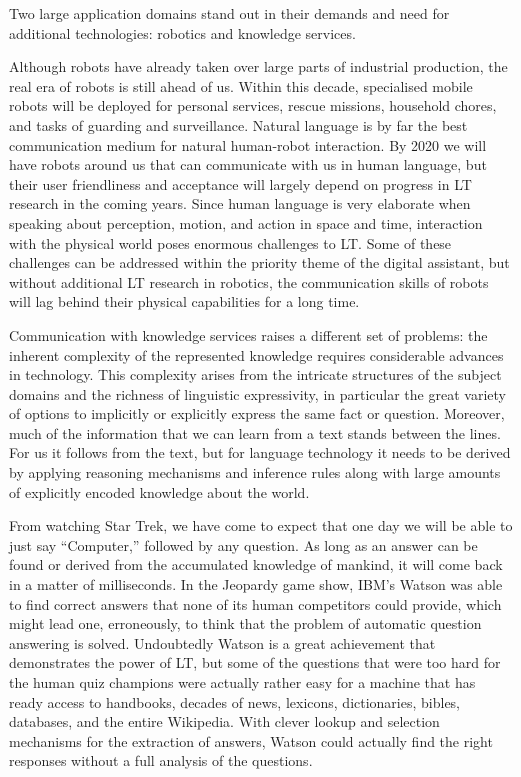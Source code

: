 \documentclass[10pt, plain]{../../metanetpaper}
\begin{document}
\begin{multicols}{2}
Two large application domains stand out in their demands and need for additional technologies: robotics and knowledge services.
 
Although robots have already taken over large parts of industrial production, the real era of robots is still ahead of us. Within this decade, specialised mobile robots will be deployed for personal services, rescue missions, household chores, and tasks of guarding and surveillance. Natural language is by far the best communication medium for natural human-robot interaction. By 2020 we will have robots around us that can communicate with us in human language, but their user friendliness and acceptance will largely depend on progress in LT research in the coming years. Since human language is very elaborate when speaking about perception, motion, and action in space and time, interaction with the physical world poses enormous challenges to LT. Some of these challenges can be addressed within the priority theme of the digital assistant, but without additional LT research in robotics, the communication skills of robots will lag behind their physical capabilities for a long time.
 
Communication with knowledge services raises a different set of problems: the inherent complexity of the represented knowledge requires considerable advances in technology. This complexity arises from the intricate structures of the subject domains and the richness of linguistic expressivity, in particular the great variety of options to implicitly or explicitly express the same fact or question. Moreover, much of the information that we can learn from a text stands between the lines. For us it follows from the text, but for language technology it needs to be derived by applying reasoning mechanisms and inference rules along with large amounts of explicitly encoded knowledge about the world.
 
From watching Star Trek, we have come to expect that one day we will be able to just say “Computer,” followed by any question. As long as an answer can be found or derived from the accumulated knowledge of mankind, it will come back in a matter of milliseconds. In the Jeopardy game show, IBM’s Watson was able to find correct answers that none of its human competitors could provide, which might lead one, erroneously, to think that the problem of automatic question answering is solved. Undoubtedly Watson is a great achievement that demonstrates the power of LT, but some of the questions that were too hard for the human quiz champions were actually rather easy for a machine that has ready access to handbooks, decades of news, lexicons, dictionaries, bibles, databases, and the entire Wikipedia. With clever lookup and selection mechanisms for the extraction of answers, Watson could actually find the right responses without a full analysis of the questions.
 

\end{multicols}
\end{document}
